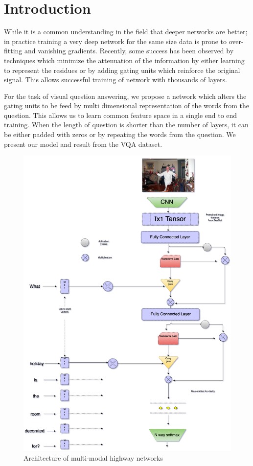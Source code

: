 
\section{Introduction}

While it is a common understanding in the field that deeper networks are better\cite{ba2014deep}; in practice training a very deep network for the same size data is prone to over-fitting and vanishing gradients. Recently, some success has been observed by techniques which minimize the attenuation of the information by either learning to represent the residues\cite{he2015deep} or by adding gating units which reinforce the original signal\cite{srivastava2015highway}. This allows successful training of network with thousands of layers.

For the task of visual question answering, we propose a network which alters the gating units to be feed by multi dimensional representation of the words from the question. This allows us to learn common feature space in a single end to end training. When the length of question is shorter than the number of layers, it can be either padded with zeros or by repeating the words from the question. We present our model and result from the VQA dataset\cite{antol2015vqa}. 

\begin{figure}[H]
\centering
   \includegraphics[width=1\linewidth, scale=0.9]{figures/vqa/model.pdf}
    \caption{Architecture of multi-modal highway networks}
    \label{fig:long}
    \label{fig:onecol}
\end{figure}

